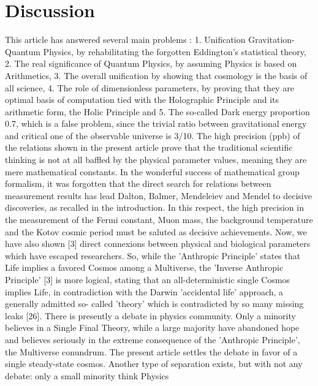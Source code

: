 \chapter{Discussion}
\label{chap:chapter_4}

This article has answered several main problems : 1. Unification Gravitation-Quantum Physics,
by rehabilitating the forgotten Eddington's statistical theory, 2. The real significance of Quantum
Physics, by assuming Physics is based on Arithmetics, 3. The overall unification by showing that
cosmology is the basis of all science, 4. The role of dimensionless parameters, by proving that they
are optimal basis of computation tied with the Holographic Principle and its arithmetic form, the
Holic Principle and 5. The so-called Dark energy proportion 0.7, which is a false problem, since the
trivial ratio between gravitational energy and critical one of the observable universe is 3/10.
The high precision (ppb) of the relations shown in the present article prove that the traditional
scientific thinking is not at all baffled by the physical parameter values, meaning they are mere
mathematical constants. In the wonderful success of mathematical group formalism, it was
forgotten that the direct search for relations between measurement results has lead Dalton, Balmer,
Mendeleiev and Mendel to decisive discoveries, as recalled in the introduction. In this respect, the
high precision in the measurement of the Fermi constant, Muon mass, the background temperature
and the Kotov cosmic period must be saluted as decisive achievements. Now, we have also shown
[3] direct connexions between physical and biological parameters which have escaped researchers.
So, while the 'Anthropic Principle' states that Life implies a favored Cosmos among a Multiverse,
the 'Inverse Anthropic Principle' [3] is more logical, stating that an all-deterministic single Cosmos
implies Life, in contradiction with the Darwin 'accidental life' approach, a generally admitted so-
called 'theory' which is contradicted by so many missing leaks [26].
There is presently a debate in physics community. Only a minority believes in a Single Final
Theory, while a large majority have abandoned hope and believes seriously in the extreme
consequence of the 'Anthropic Principle', the Multiverse conundrum. The present article settles the
debate in favor of a single steady-state cosmos.
Another type of separation exists, but with not any debate: only a small minority think Physics
